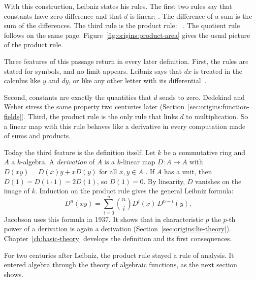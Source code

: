 
With this construction, Leibniz states his rules. The first two rules say that constants have zero difference and that $d$ is
linear: . The
difference of a sum is the sum of the differences. The third rule is the
product rule: %
~\cite[p.~467]{Leibniz1684}. The quotient rule follows on the same page.
Figure~\ref{fig:origins:product-area} gives the usual picture of the product
rule.


Three features of this passage return in every later definition. First, the
rules are stated for symbols, and no limit appears. Leibniz says that $dx$ is
treated in the calculus like $y$ and $dy$, or like any other letter with its
differential~\cite[p.~467]{Leibniz1684}.

Second, constants are exactly the quantities that $d$ sends to zero. Dedekind
and Weber stress the same property two centuries later
(Section~\ref{sec:origins:function-fields}). Third, the product rule is the
only rule that links $d$ to multiplication. So a linear map with this rule
behaves like a derivative in every computation made of sums and products.

Today the third feature is the definition itself. Let $k$ be a commutative ring and $A$ a $k$-algebra. A \emph{derivation} of
$A$ is a $k$-linear map $D\colon A \to A$ with $D(xy) = D(x)y + xD(y)$ for all
$x, y \in A$ \cite[p.~206]{Jacobson1937}. If $A$ has a unit, then $D(1) = D(1\cdot 1) = 2D(1)$, so
$D(1) = 0$. By linearity, $D$ vanishes on the image of $k$. Induction on the
product rule gives the general Leibniz formula:
\[
  D^n(xy) = \sum_{i=0}^{n} \binom{n}{i} D^i(x)\, D^{n-i}(y).
\]
Jacobson uses this formula in 1937. It shows that in characteristic $p$ the
$p$-th power of a derivation is again a derivation
(Section~\ref{sec:origins:lie-theory}). Chapter~\ref{ch:basic-theory}
develops the definition and its first consequences.

For two centuries after Leibniz, the product rule stayed a rule of analysis.
It entered algebra through the theory of algebraic functions, as the next
section shows.
